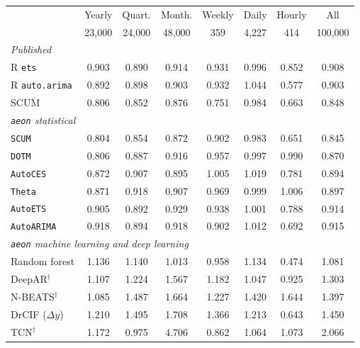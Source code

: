 \begin{tabular}{lccccccc}
\toprule
 & Yearly & Quart. & Month. & Weekly & Daily & Hourly & All \\
 & 23{,}000 & 24{,}000 & 48{,}000 & 359 & 4{,}227 & 414 & 100{,}000 \\
\midrule
\multicolumn{8}{l}{\emph{Published}} \\
R \texttt{ets}         & 0.903 & 0.890 & 0.914 & 0.931 & 0.996 & 0.852 & 0.908 \\
R \texttt{auto.arima}  & 0.892 & 0.898 & 0.903 & 0.932 & 1.044 & 0.577 & 0.903 \\
SCUM                   & 0.806 & 0.852 & 0.876 & 0.751 & 0.984 & 0.663 & 0.848 \\
\midrule
\multicolumn{8}{l}{\emph{\texttt{aeon} statistical}} \\
\texttt{SCUM}          & 0.804 & 0.854 & 0.872 & 0.902 & 0.983 & 0.651 & 0.845 \\
\texttt{DOTM}          & 0.806 & 0.887 & 0.916 & 0.957 & 0.997 & 0.990 & 0.870 \\
\texttt{AutoCES}       & 0.872 & 0.907 & 0.895 & 1.005 & 1.019 & 0.781 & 0.894 \\
\texttt{Theta}         & 0.871 & 0.918 & 0.907 & 0.969 & 0.999 & 1.006 & 0.897 \\
\texttt{AutoETS}       & 0.905 & 0.892 & 0.929 & 0.938 & 1.001 & 0.788 & 0.914 \\
\texttt{AutoARIMA}     & 0.918 & 0.894 & 0.918 & 0.902 & 1.012 & 0.692 & 0.915 \\
\midrule
\multicolumn{8}{l}{\emph{\texttt{aeon} machine learning and deep learning}} \\
Random forest          & 1.136 & 1.140 & 1.013 & 0.958 & 1.134 & 0.474 & 1.081 \\
DeepAR$^\dagger$       & 1.107 & 1.224 & 1.567 & 1.182 & 1.047 & 0.925 & 1.303 \\
N-BEATS$^\dagger$      & 1.085 & 1.487 & 1.664 & 1.227 & 1.420 & 1.644 & 1.397 \\
DrCIF ($\Delta y$)     & 1.210 & 1.495 & 1.708 & 1.366 & 1.213 & 0.643 & 1.450 \\
TCN$^\dagger$          & 1.172 & 0.975 & 4.706 & 0.862 & 1.064 & 1.073 & 2.066 \\
\bottomrule
\end{tabular}
